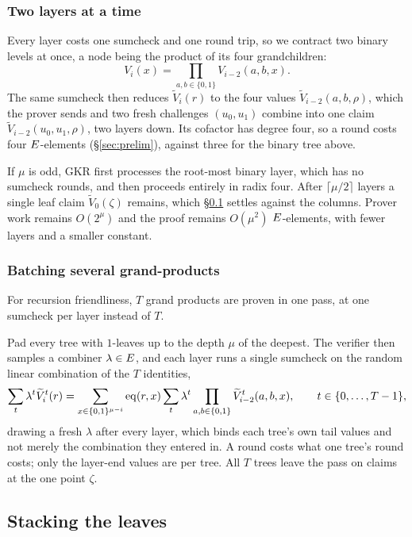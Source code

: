 \subsubsection{Two layers at a time}

Every layer costs one sumcheck and one round trip, so we contract two binary levels at once, a node being the product of its four grandchildren:
\[
V_i(x)=\prod_{a,b\in\{0,1\}}V_{i-2}(a,b,x).
\]
The same sumcheck then reduces $\widetilde V_i(r)$ to the four values $\widetilde V_{i-2}(a,b,\rho)$, which the prover sends and two fresh challenges $(u_0,u_1)$ combine into one claim $\widetilde V_{i-2}(u_0,u_1,\rho)$, two layers down. Its cofactor has degree four, so a round costs four $E$-elements (\S\ref{sec:prelim}), against three for the binary tree above.

If $\mu$ is odd, GKR first processes the root-most binary layer, which has no sumcheck rounds, and then proceeds entirely in radix four. After $\lceil\mu/2\rceil$ layers a single leaf claim $\widetilde V_0(\zeta)$ remains, which \S\ref{sec:leafstack} settles against the columns. Prover work remains $O(2^\mu)$ and the proof remains $O(\mu^2)$ $E$-elements, with fewer layers and a smaller constant.

\subsubsection{Batching several grand-products}

For recursion friendliness, $T$ grand products are proven in one pass, at one sumcheck per layer instead of $T$.

Pad every tree with $1$-leaves up to the depth $\mu$ of the deepest. The verifier then samples a combiner $\lambda \in E$, and each layer runs a single sumcheck on the random linear combination of the $T$ identities,
\[
\sum_t\lambda^t\widetilde V_i^t(r)=\sum_{x\in\{0,1\}^{\mu-i}}\operatorname{eq}(r,x)\sum_t\lambda^t\prod_{a,b\in\{0,1\}}\widetilde V_{i-2}^t(a,b,x),\qquad t\in\{0,\dots,T-1\},
\]
drawing a fresh $\lambda$ after every layer, which binds each tree's own tail values and not merely the combination they entered in. A round costs what one tree's round costs; only the layer-end values are per tree. All $T$ trees leave the pass on claims at the one point $\zeta$.

\subsection{Stacking the leaves}\label{sec:leafstack}

